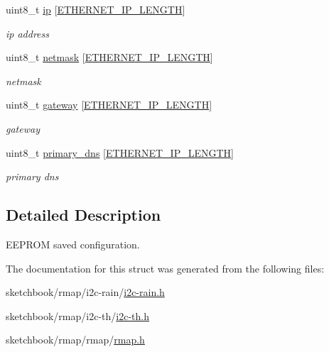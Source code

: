 \begin{DoxyCompactItemize}
\mbox{\label{structconfiguration__t_a0b698acfbb52f889c906b9b175f7a5d5}} 
uint8\+\_\+t \hyperlink{structconfiguration__t_a0b698acfbb52f889c906b9b175f7a5d5}{ip} \mbox{[}\hyperlink{ethernet__config_8h_ae8de53528e88d8ff4516d82a48590bd7}{E\+T\+H\+E\+R\+N\+E\+T\+\_\+\+I\+P\+\_\+\+L\+E\+N\+G\+TH}\mbox{]}
\begin{DoxyCompactList}\small\item\em ip address \end{DoxyCompactList}\item 
\mbox{\label{structconfiguration__t_a60716ed8c6a82119a46eb6345b88ca32}} 
uint8\+\_\+t \hyperlink{structconfiguration__t_a60716ed8c6a82119a46eb6345b88ca32}{netmask} \mbox{[}\hyperlink{ethernet__config_8h_ae8de53528e88d8ff4516d82a48590bd7}{E\+T\+H\+E\+R\+N\+E\+T\+\_\+\+I\+P\+\_\+\+L\+E\+N\+G\+TH}\mbox{]}
\begin{DoxyCompactList}\small\item\em netmask \end{DoxyCompactList}\item 
\mbox{\label{structconfiguration__t_a9d18b7f4094f4d7a50d2245e0370adc0}} 
uint8\+\_\+t \hyperlink{structconfiguration__t_a9d18b7f4094f4d7a50d2245e0370adc0}{gateway} \mbox{[}\hyperlink{ethernet__config_8h_ae8de53528e88d8ff4516d82a48590bd7}{E\+T\+H\+E\+R\+N\+E\+T\+\_\+\+I\+P\+\_\+\+L\+E\+N\+G\+TH}\mbox{]}
\begin{DoxyCompactList}\small\item\em gateway \end{DoxyCompactList}\item 
\mbox{\label{structconfiguration__t_acd481c434576a90959c342e877985b32}} 
uint8\+\_\+t \hyperlink{structconfiguration__t_acd481c434576a90959c342e877985b32}{primary\+\_\+dns} \mbox{[}\hyperlink{ethernet__config_8h_ae8de53528e88d8ff4516d82a48590bd7}{E\+T\+H\+E\+R\+N\+E\+T\+\_\+\+I\+P\+\_\+\+L\+E\+N\+G\+TH}\mbox{]}
\begin{DoxyCompactList}\small\item\em primary dns \end{DoxyCompactList}\end{DoxyCompactItemize}


\subsection{Detailed Description}
E\+E\+P\+R\+OM saved configuration. 

The documentation for this struct was generated from the following files\+:\begin{DoxyCompactItemize}
\item 
sketchbook/rmap/i2c-\/rain/\hyperlink{i2c-rain_8h}{i2c-\/rain.\+h}\item 
sketchbook/rmap/i2c-\/th/\hyperlink{i2c-th_8h}{i2c-\/th.\+h}\item 
sketchbook/rmap/rmap/\hyperlink{rmap_8h}{rmap.\+h}\end{DoxyCompactItemize}
